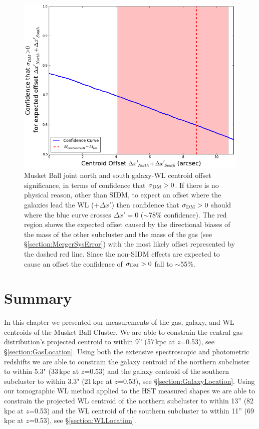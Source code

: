 \begin{figure}
\centering
\includegraphics[width=5in]{Chapter4/AnalysisFiles/NorthSouthJointAnalysis_delxPC.png}
\caption[Musket Ball joint northern and southern subcluster galaxy and weak lensing centroid offset significance.]{
Musket Ball joint north and south galaxy-WL centroid offset significance, in terms of confidence that $\sigma_{\rm DM}>0$.
If there is no physical reason, other than SIDM, to expect an offset where the galaxies lead the WL ($+\Delta x'$) then confidence that $\sigma_{\rm DM}>0$ should where the blue curve crosses $\Delta x'=0$ ($\sim$78\% confidence).
The red region shows the expected offset caused by the directional biases of the mass of the other subcluster and the mass of the gas (see \S\ref{section:MergerSysError}) with the most likely offset represented by the dashed red line.
Since the non-SIDM effects are expected to cause an offset the confidence of $\sigma_{\rm DM}>0$ fall to $\sim$55\%.
}
\label{figure:CentroidSignificance_NorthPlusSouth}
\end{figure}

\section{Summary}

In this chapter we presented our measurements of the gas, galaxy, and WL centroids of the Musket Ball Cluster.
We are able to constrain the central gas distribution's projected centroid to within 9'' (57\,kpc at $z$=0.53), see \S\ref{section:GasLocation}.
Using both the extensive spectroscopic and photometric redshifts we are able to constrain the galaxy centroid of the northern subcluster to within 5.3" (33\,kpc at $z$=0.53) and the galaxy centroid of the southern subcluster to within 3.3" (21\,kpc at $z$=0.53), see \S\ref{section:GalaxyLocation}.
Using our tomographic WL method applied to the HST measured shapes we are able to constrain the projected WL centroid of the northern subcluster to within 13'' (82\,kpc at $z$=0.53) and the WL centroid of the southern subcluster to within 11'' (69\,kpc at $z$=0.53), see \S\ref{section:WLLocation}.

